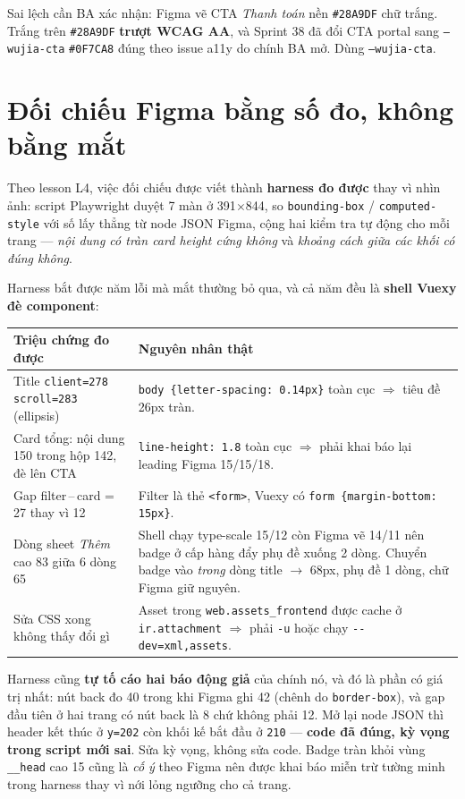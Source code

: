 Sai lệch cần BA xác nhận: Figma vẽ CTA \emph{Thanh toán} nền \texttt{\#28A9DF} chữ trắng. Trắng trên
\texttt{\#28A9DF} \textbf{trượt WCAG AA}, và Sprint 38 đã đổi CTA portal sang \texttt{--wujia-cta}
\texttt{\#0F7CA8} đúng theo issue a11y do chính BA mở. Dùng \texttt{--wujia-cta}.

\section{Đối chiếu Figma bằng số đo, không bằng mắt}

Theo lesson L4, việc đối chiếu được viết thành \textbf{harness đo được} thay vì nhìn ảnh: script
Playwright duyệt 7 màn ở 391$\times$844, so \texttt{bounding-box} / \texttt{computed-style} với số
lấy thẳng từ node JSON Figma, cộng hai kiểm tra tự động cho mỗi trang --- \emph{nội dung có tràn card
height cứng không} và \emph{khoảng cách giữa các khối có đúng không}.

Harness bắt được năm lỗi mà mắt thường bỏ qua, và cả năm đều là \textbf{shell Vuexy đè component}:

\begin{center}
\begin{tabular}{p{4.4cm}p{9.4cm}}
\hline
\textbf{Triệu chứng đo được} & \textbf{Nguyên nhân thật} \\
\hline
Title \texttt{client=278 scroll=283} (ellipsis) & \texttt{body \{letter-spacing: 0.14px\}} toàn cục
$\Rightarrow$ tiêu đề 26px tràn. \\
Card tổng: nội dung 150 trong hộp 142, đè lên CTA & \texttt{line-height: 1.8} toàn cục $\Rightarrow$
phải khai báo lại leading Figma 15/15/18. \\
Gap filter\,--\,card = 27 thay vì 12 & Filter là thẻ \texttt{<form>}, Vuexy có
\texttt{form \{margin-bottom: 15px\}}. \\
Dòng sheet \emph{Thêm} cao 83 giữa 6 dòng 65 & Shell chạy type-scale 15/12 còn Figma vẽ 14/11 nên
badge ở cấp hàng đẩy phụ đề xuống 2 dòng. Chuyển badge vào \emph{trong} dòng title $\to$ 68px, phụ đề
1 dòng, chữ Figma giữ nguyên. \\
Sửa CSS xong không thấy đổi gì & Asset trong \texttt{web.assets\_frontend} được cache ở
\texttt{ir.attachment} $\Rightarrow$ phải \texttt{-u} hoặc chạy \texttt{-{}-dev=xml,assets}. \\
\hline
\end{tabular}
\end{center}

Harness cũng \textbf{tự tố cáo hai báo động giả} của chính nó, và đó là phần có giá trị nhất: nút
back đo 40 trong khi Figma ghi 42 (chênh do \texttt{border-box}), và gap đầu tiên ở hai trang có nút
back là 8 chứ không phải 12. Mở lại node JSON thì header kết thúc ở \texttt{y=202} còn khối kế bắt
đầu ở \texttt{210} --- \textbf{code đã đúng, kỳ vọng trong script mới sai}. Sửa kỳ vọng, không sửa
code. Badge tràn khỏi vùng \texttt{\_\_head} cao 15 cũng là \emph{cố ý} theo Figma nên được khai báo
miễn trừ tường minh trong harness thay vì nới lỏng ngưỡng cho cả trang.

